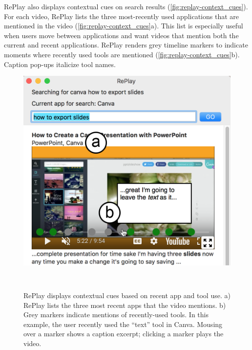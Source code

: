 RePlay also displays contextual cues \cite{Ekstrand2011} on search results (\autoref{fig:replay-context_cues}). For each video, RePlay lists the three most-recently used applications that are mentioned in the video (\autoref{fig:replay-context_cues}a). This list is especially useful when users move between applications and want videos that mention both the current and recent applications. RePlay renders grey timeline markers to indicate moments where recently used tools are mentioned (\autoref{fig:replay-context_cues}b). Caption pop-ups italicize tool names.


\begin{figure}[b!]
\centering
\vspace{-0.2in}
  \includegraphics[width=\textwidth]{replay/figures/context_cues.png}
  \caption{RePlay displays contextual cues based on recent app and tool use. a) RePlay lists the three most recent apps that the video mentions. b) Grey markers indicate mentions of recently-used tools. In this example, the user recently used the ``text'' tool in Canva. Mousing over a marker shows a caption excerpt; clicking a marker plays the video. }~\label{fig:replay-context_cues}
  \vspace{-0.2in}
\end{figure}

